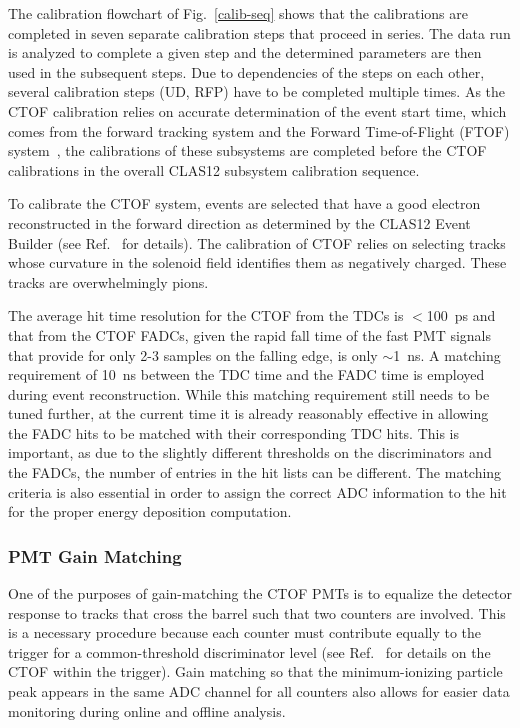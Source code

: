 \documentclass[3p,times,twocolumn]{elsarticle}
\begin{document}
The calibration flowchart of Fig.~\ref{calib-seq} shows that the calibrations are completed in seven separate
calibration steps that proceed in series. The data run is analyzed to complete a given step and the determined
parameters are then used in the subsequent steps. Due to dependencies of the steps on each other, several
calibration steps (UD, RFP) have to be completed multiple times. As the CTOF calibration relies on accurate
determination of the event start time, which comes from the forward tracking system and the Forward
Time-of-Flight (FTOF) system~\cite{ftof-nim}, the calibrations of these subsystems are completed before
the CTOF calibrations in the overall CLAS12 subsystem calibration sequence.

To calibrate the CTOF system, events are selected that have a good electron reconstructed in the forward
direction as determined by the CLAS12 Event Builder (see Ref.~\cite{recon-nim} for details). The calibration
of CTOF relies on selecting tracks whose curvature in the solenoid field identifies them as negatively charged.
These tracks are overwhelmingly pions.

The average hit time resolution for the CTOF from the TDCs is $<$100~ps and that from the CTOF
FADCs, given the rapid fall time of the fast PMT signals that provide for only 2-3 samples on the falling
edge, is only $\sim$1~ns. A matching requirement of 10~ns between the TDC time and the FADC time is
employed during event reconstruction. While this matching requirement still needs to be tuned further,
at the current time it is already reasonably effective in allowing the FADC hits to be matched with their
corresponding TDC hits. This is important, as due to the slightly different thresholds on the discriminators
and the FADCs, the number of entries in the hit lists can be different. The matching criteria is also essential
in order to assign the correct ADC information to the hit for the proper energy deposition computation.

\subsubsection{PMT Gain Matching}
\label{gain-matching}

One of the purposes of gain-matching the CTOF PMTs is to equalize the detector response to tracks that
cross the barrel such that two counters are involved. This is a necessary procedure because each counter
must contribute equally to the trigger for a common-threshold discriminator level (see Ref.~\cite{trigger-nim}
for details on the CTOF within the trigger). Gain matching so that the minimum-ionizing particle peak appears
in the same ADC channel for all counters also allows for easier data monitoring during online and offline analysis.
\end{document}
